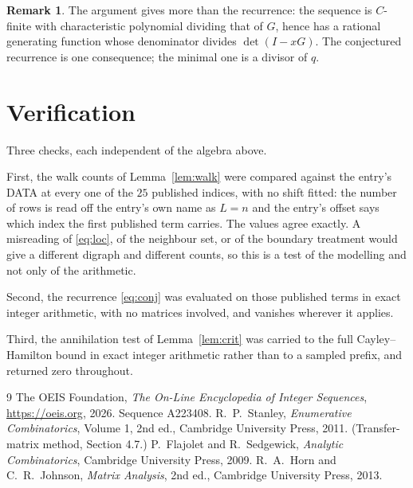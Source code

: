 \documentclass[11pt,a4paper]{article}
\theoremstyle{plain}
\theoremstyle{definition}
\newtheorem{remark}[theorem]{Remark}
\begin{document}
\begin{remark}
The argument gives more than the recurrence: the sequence is $C$-finite with characteristic
polynomial dividing that of $G$, hence has a rational generating function whose denominator
divides $\det(I-xG)$. The conjectured recurrence is one consequence; the minimal one is a
divisor of $q$.
\end{remark}

\section{Verification}

Three checks, each independent of the algebra above.

First, the walk counts of Lemma~\ref{lem:walk} were compared against the entry's DATA at
every one of the $25$ published indices, with no shift fitted: the number of rows is
read off the entry's own name as $L=n$ and the entry's offset says which index the first
published term carries. The values agree exactly. A misreading of \eqref{eq:loc}, of the
neighbour set, or of the boundary treatment would give a different digraph and different
counts, so this is a test of the modelling and not only of the arithmetic.

Second, the recurrence \eqref{eq:conj} was evaluated on those published terms in exact
integer arithmetic, with no matrices involved, and vanishes wherever it applies.

Third, the annihilation test of Lemma~\ref{lem:crit} was carried to the full
Cayley--Hamilton bound in exact integer arithmetic rather than to a sampled prefix, and
returned zero throughout.

\begin{thebibliography}{9}
 The OEIS Foundation, \emph{The On-Line Encyclopedia of Integer
Sequences}, \url{https://oeis.org}, 2026. Sequence A223408.
 R.~P.~Stanley, \emph{Enumerative Combinatorics}, Volume 1, 2nd ed.,
Cambridge University Press, 2011. (Transfer-matrix method, Section 4.7.)
 P.~Flajolet and R.~Sedgewick, \emph{Analytic Combinatorics}, Cambridge
University Press, 2009.
 R.~A.~Horn and C.~R.~Johnson, \emph{Matrix Analysis}, 2nd ed., Cambridge
University Press, 2013.
\end{thebibliography}
\end{document}
